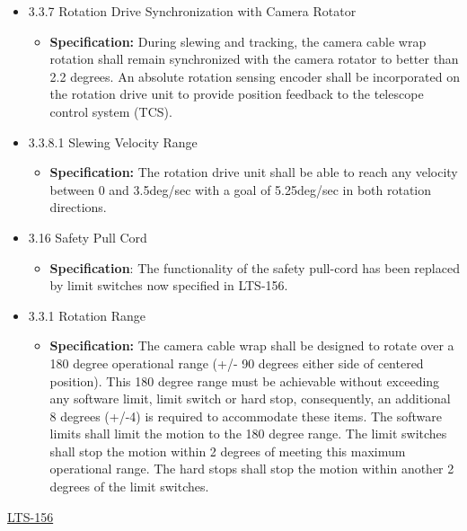 \documentclass[SE,lsstdraft,authoryear,toc]{lsstdoc}
\begin{document}
\begin{itemize}
\item
  3.3.7 Rotation Drive Synchronization with Camera Rotator

  \begin{itemize}
  \item
    \textbf{Specification:} During slewing and tracking, the camera
    cable wrap rotation shall remain synchronized with the camera
    rotator to better than 2.2 degrees. An absolute rotation sensing
    encoder shall be incorporated on the rotation drive unit to provide
    position feedback to the telescope control system (TCS).
  \end{itemize}
\item
  3.3.8.1 Slewing Velocity Range

  \begin{itemize}
  \item
    \textbf{Specification:} The rotation drive unit shall be able to
    reach any velocity between 0 and 3.5deg/sec with a goal of
    5.25deg/sec in both rotation directions.
  \end{itemize}
\item
  3.16 Safety Pull Cord

  \begin{itemize}
  \item
    \textbf{Specification}: The functionality of the safety pull-cord
    has been replaced by limit switches now specified in LTS-156.
  \end{itemize}
\item
  3.3.1 Rotation Range

  \begin{itemize}
  \item
    \textbf{Specification:} The camera cable wrap shall be designed to rotate
    over a 180 degree operational range (+/- 90 degrees either side of
    centered position). This 180 degree range must be achievable without
    exceeding any software limit, limit switch or hard stop,
    consequently, an additional 8 degrees (+/-4) is required to
    accommodate these items. The software limits shall limit the motion
    to the 180 degree range. The limit switches shall stop the motion
    within 2 degrees of meeting this maximum operational range. The hard
    stops shall stop the motion within another 2 degrees of the limit
    switches.
  \end{itemize}
\end{itemize}

\underline{LTS-156}
\end{document}
